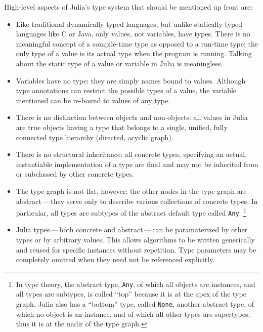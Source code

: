 \documentclass{article}
\begin{document}
High-level aspects of Julia's type system that should be mentioned up front are:
\begin{itemize}

\item Like traditional dynamically typed languages, but unlike statically typed languages like C or Java, only values, not variables, have types.
There is no meaningful concept of a compile-time type as opposed to a run-time type:
the only type of a value is its actual type when the program is running.
Talking about the static type of a value or variable in Julia is meaningless.

\item Variables have no type: they are simply names bound to values.
Although type annotations can restrict the possible types of a value, the variable mentioned can be re-bound to values of any type.

\item There is no distinction between objects and non-objects:
all values in Julia are true objects having a type that belongs to a single, unified, fully connected type hierarchy (directed, acyclic graph).

\item There is no structural inheritance:
all concrete types, specifying an actual, instantiable implementation of a type are final and may not be inherited from or subclassed by other concrete types.

\item The type graph is not flat, however:
the other nodes in the type graph are abstract\,---\,they serve only to describe various collections of concrete types.
In particular, all types are subtypes of the abstract default type called \verb|Any|.%
\footnote{In type theory, the abstract type, \texttt{Any}, of which all objects are instances, and all types are subtypes, is called ``top'' because it is at the apex of the type graph.
Julia also has a ``bottom'' type, called \texttt{None}, another abstract type, of which no object is an instance, and of which all other types are supertypes;
thus it is at the nadir of the type graph.}

\item Julia types\,---\,both concrete and abstract\,---\,can be paramaterized by other types or by arbitrary values.
This allows algorithms to be written generically and reused for specific instances without repetition.
Type parameters may be completely omitted when they need not be referenced explicitly.


\end{itemize}
\end{document}
